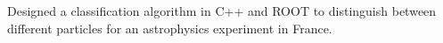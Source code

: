 \documentclass[letterpaper]{deedy-resume} %
\begin{document}
\begin{minipage}[t]{0.66\textwidth}
\sectionspace %



\begin{tightitemize}
\item Designed a classification algorithm in C++ and ROOT to distinguish between different particles for an astrophysics experiment in France.
\end{tightitemize}

\sectionspace %


  

%
%


%
%


\end{minipage} %
\end{document}
